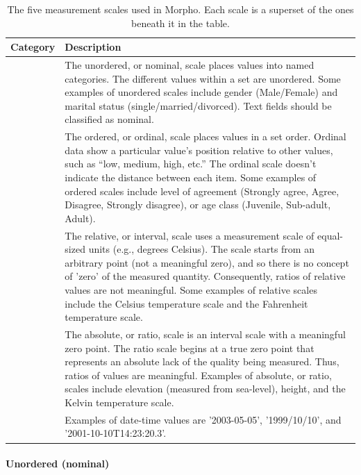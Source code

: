 \begin{table}[htbp]
  \centering
  \begin{tabular}{|c|m{}|}
  \hline
  \textbf{Category} & \textbf{Description} \\
  \hline
  \nameref{par:cat-unordered} &
    The unordered, or nominal, scale places values into named
    categories. The different values within a set are unordered. Some
    examples of unordered scales include gender (Male/Female) and
    marital status (single/married/divorced). Text fields should be
    classified as nominal. \\
  \hline
  \nameref{par:cat-ordered} &
    The ordered, or ordinal, scale places values in a set order. Ordinal
    data show a particular value's position relative to other values,
    such as ``low, medium, high, etc.'' The ordinal scale doesn't
    indicate the distance between each item. Some examples of ordered
    scales include level of agreement (Strongly agree, Agree, Disagree,
    Strongly disagree), or age class (Juvenile, Sub-adult, Adult). \\
  \hline
  \nameref{par:cat-relative} &
    The relative, or interval, scale uses a measurement scale of
    equal-sized units (e.g., degrees Celsius). The scale starts from an
    arbitrary point (not a meaningful zero), and so there is no concept
    of 'zero' of the measured quantity. Consequently, ratios of relative
    values are not meaningful. Some examples of relative scales include
    the Celsius temperature scale and the Fahrenheit temperature scale. \\
  \hline
  \nameref{par:cat-absolute} &
    The absolute, or ratio, scale is an interval scale with a meaningful
    zero point. The ratio scale begins at a true zero point that
    represents an absolute lack of the quality being measured. Thus,
    ratios of values are meaningful. Examples of absolute, or ratio,
    scales include elevation (measured from sea-level), height, and the
    Kelvin temperature scale. \\
  \hline
  \nameref{par:cat-datetime} &
    Examples of date-time values are '2003-05-05', '1999/10/10', and
    '2001-10-10T14:23:20.3'. \\
  \hline
  \end{tabular}
  \caption{The five measurement scales used in Morpho. Each scale is a
    superset of the ones beneath it in the table.}
  \label{tab:attr-categories}
\end{table}

\paragraph{Unordered (nominal)} \label{par:cat-unordered}

